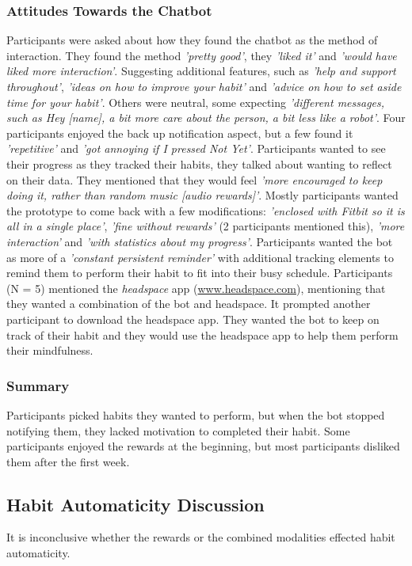 \documentclass{scaffold/sigchi}
\begin{document}
\subsubsection{Attitudes Towards the Chatbot}
Participants were asked about how they found the chatbot as the method of interaction. They found the method \textit{'pretty good'}, they \textit{'liked it'} and \textit{'would have liked more interaction'}. Suggesting additional features, such as \textit{'help and support throughout'}, \textit{'ideas on how to improve your habit'} and \textit{'advice on how to set aside time for your habit'}. Others were neutral, some expecting \textit{'different messages, such as Hey [name], a bit more care about the person, a bit less like a robot'}. Four participants enjoyed the back up notification aspect, but a few found it \textit{'repetitive'} and \textit{'got annoying if I pressed Not Yet'}. Participants wanted to see their progress as they tracked their habits, they talked about wanting to reflect on their data. They mentioned that they would feel \textit{'more encouraged to keep doing it, rather than random music [audio rewards]'}. Mostly participants wanted the prototype to come back with a few modifications: \textit{'enclosed with Fitbit so it is all in a single place'}, \textit{'fine without rewards'} (2 participants mentioned this), \textit{'more interaction'} and \textit{'with statistics about my progress'}. Participants wanted the bot as more of a \textit{'constant persistent reminder'} with additional tracking elements to remind them to perform their habit to fit into their busy schedule. Participants (N = 5) mentioned the \textit{headspace} app (\url{www.headspace.com}), mentioning that they wanted a combination of the bot and headspace. It prompted another participant to download the headspace app. They wanted the bot to keep on track of their habit and they would use the headspace app to help them perform their mindfulness.

\subsubsection{Summary}
Participants picked habits they wanted to perform, but when the bot stopped notifying them, they lacked motivation to completed their habit. Some participants enjoyed the rewards at the beginning, but most participants disliked them after the first week.

\subsection{Habit Automaticity Discussion}
It is inconclusive whether the rewards or the combined modalities effected habit automaticity. 
\end{document}
